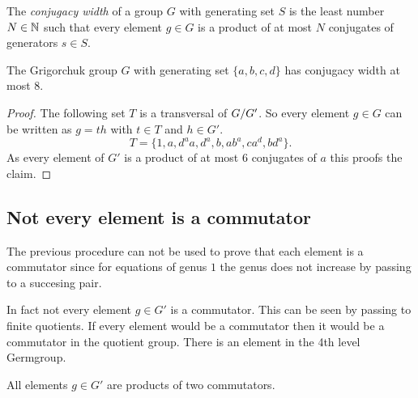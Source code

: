 \documentclass[a4paper,11pt]{amsart}
\begin{document}
\begin{defi}
 The \emph{conjugacy width} of a group $G$ with generating set $S$ 
 is the least number $N\in\mathbb{N}$ such that every element $g\in G$ is a product of
 at most $N$ conjugates of generators $s\in S$.
\end{defi}
\begin{cor}
 The Grigorchuk group $G$ with generating set $\{a,b,c,d\}$ has conjugacy width at most $8$.
\end{cor}
\begin{proof}
 The following set $T$ is a transversal of ${G/G'}$. So every element $g\in G$ can be written as $g=th$ with $t\in T$ and $h\in G'$.
 \[T=\{1,a,d^aa,d^a,b,ab^a,ca^d,bd^a\}.\]
 As every element of $G'$ is a product of at most $6$ conjugates of $a$ this proofs the claim.

\end{proof}




\subsection{Not every element is a commutator}
The previous procedure can not be used to prove that each element is a commutator since for equations of genus $1$ the 
genus does not increase by passing to a succesing pair. 

In fact not every element $g\in G'$ is a commutator. This can be seen by passing to finite quotients. If every element would be a commutator then
it would be a commutator in the quotient group. 
There is an element in the 4th level Germgroup. 

\begin{cor}
 All elements $g\in G'$ are products of two commutators.
\end{cor}
\end{document}
